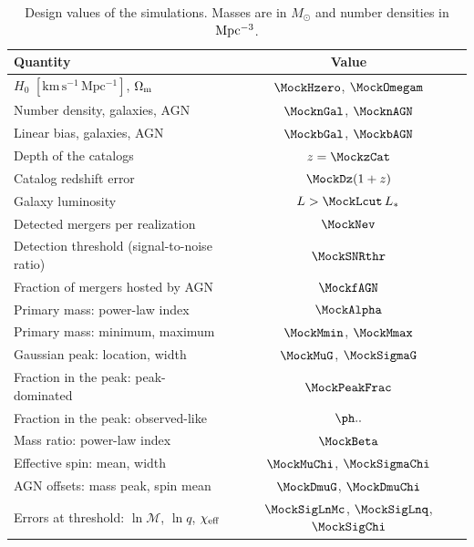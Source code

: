 \documentclass[aps,prd,reprint,superscriptaddress,nofootinbib,nolongbibliography,floatfix]{revtex4-2}
\newcommand{\Msun}{M_\odot}
\newcommand{\chieff}{\chi_{\rm eff}}
\begin{document}
\begin{table}
\caption{Design values of the simulations. Masses are in $\Msun$ and number densities in ${\rm Mpc^{-3}}$.}
\label{tab:design}
\begin{ruledtabular}
\begin{tabular}{lc}
Quantity & Value\\
\hline
$H_0$ $[\mathrm{km\,s^{-1}\,Mpc^{-1}}]$, $\Omega_{\rm m}$ & $\MockHzero$, $\MockOmegam$\\
Number density, galaxies, AGN & $\MocknGal$, $\MocknAGN$\\
Linear bias, galaxies, AGN & $\MockbGal$, $\MockbAGN$\\
Depth of the catalogs & $z=\MockzCat$\\
Catalog redshift error & $\MockDz(1+z)$\\
Galaxy luminosity & $L>\MockLcut\,L_*$\\
Detected mergers per realization & $\MockNev$\\
Detection threshold (signal-to-noise ratio) & $\MockSNRthr$\\
Fraction of mergers hosted by AGN & $\MockfAGN$\\
Primary mass: power-law index & $\MockAlpha$\\
Primary mass: minimum, maximum & $\MockMmin$, $\MockMmax$\\
Gaussian peak: location, width & $\MockMuG$, $\MockSigmaG$\\
Fraction in the peak: peak-dominated & $\MockPeakFrac$\\
Fraction in the peak: observed-like & $\ObsPeakFrac$\\
Mass ratio: power-law index & $\MockBeta$\\
Effective spin: mean, width & $\MockMuChi$, $\MockSigmaChi$\\
AGN offsets: mass peak, spin mean & $\MockDmuG$, $\MockDmuChi$\\
Errors at threshold: $\ln\mathcal{M}$, $\ln q$, $\chieff$ & $\MockSigLnMc$, $\MockSigLnq$, $\MockSigChi$\\
\end{tabular}
\end{ruledtabular}
\end{table}
\end{document}
